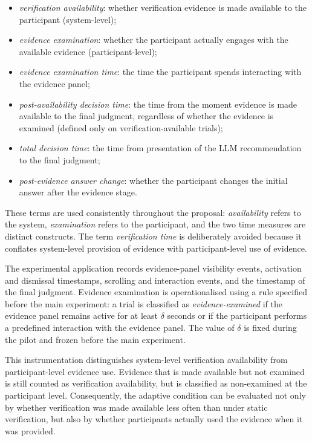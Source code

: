 \documentclass[oneside,final,14pt,a4paper]{extreport}
\begin{document}
\begin{itemize}
    \item \emph{verification availability}: whether verification evidence is made available to the participant (system-level);
    \item \emph{evidence examination}: whether the participant actually engages with the available evidence (participant-level);
    \item \emph{evidence examination time}: the time the participant spends interacting with the evidence panel;
    \item \emph{post-availability decision time}: the time from the moment evidence is made available to the final judgment, regardless of whether the evidence is examined (defined only on verification-available trials);
    \item \emph{total decision time}: the time from presentation of the LLM recommendation to the final judgment;
    \item \emph{post-evidence answer change}: whether the participant changes the initial answer after the evidence stage.
\end{itemize}

These terms are used consistently throughout the proposal: 
\emph{availability} refers to the system, \emph{examination} refers to the
participant, and the two time measures are distinct constructs. The term
\emph{verification time} is deliberately avoided because it conflates
system-level provision of evidence with participant-level use of evidence.

The experimental application records evidence-panel visibility events, 
activation and dismissal timestamps, scrolling and interaction events, 
and the timestamp of the final judgment. Evidence examination is 
operationalised using a rule specified before the main experiment: a trial 
is classified as \emph{evidence-examined} if the evidence panel remains 
active for at least $\delta$ seconds or if the participant performs a 
predefined interaction with the evidence panel. The value of $\delta$ is 
fixed during the pilot and frozen before the main experiment.

This instrumentation distinguishes system-level verification availability 
from participant-level evidence use. Evidence that is made available but 
not examined is still counted as verification availability, but is classified 
as non-examined at the participant level. Consequently, the adaptive condition 
can be evaluated not only by whether verification was made available less often 
than under static verification, but also by whether participants actually 
used the evidence when it was provided.
\end{document}
